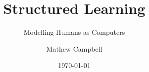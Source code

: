 \documentclass[a4paper]{report}
\title{Structured Learning}
\subtitle{Modelling Humans as Computers}
\author{Mathew Campbell}
\date{\today}
\begin{document}
  \makeTYPTitle

  

  \tableofcontents

  
  
  
  
  
  
  
  

  

  \begin{appendices}
    
    
    
  \end{appendices}
\end{document}

